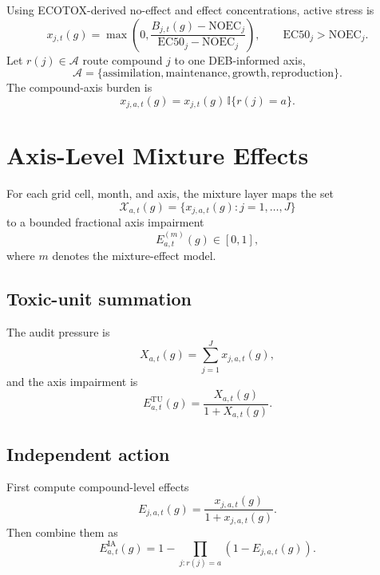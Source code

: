 \documentclass[11pt]{article}
\begin{document}
Using ECOTOX-derived no-effect and effect concentrations, active stress is
\begin{equation}
x_{j,t}(g)
=\max\left(0,\frac{B_{j,t}(g)-\mathrm{NOEC}_j}{\mathrm{EC50}_j-\mathrm{NOEC}_j}\right),
\qquad \mathrm{EC50}_j>\mathrm{NOEC}_j.
\end{equation}
Let $r(j)\in\mathcal{A}$ route compound $j$ to one DEB-informed axis,
\begin{equation}
\mathcal{A}=\{\mathrm{assimilation},\mathrm{maintenance},\mathrm{growth},\mathrm{reproduction}\}.
\end{equation}
The compound-axis burden is
\begin{equation}
x_{j,a,t}(g)=x_{j,t}(g)\,\mathbb{I}\{r(j)=a\}.
\end{equation}

\section{Axis-Level Mixture Effects}
For each grid cell, month, and axis, the mixture layer maps the set
\begin{equation}
\mathcal{X}_{a,t}(g)=\{x_{j,a,t}(g):j=1,\ldots,J\}
\end{equation}
to a bounded fractional axis impairment
\begin{equation}
E_{a,t}^{(m)}(g)\in[0,1],
\end{equation}
where $m$ denotes the mixture-effect model.

\subsection{Toxic-unit summation}
The audit pressure is
\begin{equation}
X_{a,t}(g)=\sum_{j=1}^{J}x_{j,a,t}(g),
\end{equation}
and the axis impairment is
\begin{equation}
E_{a,t}^{\mathrm{TU}}(g)=\frac{X_{a,t}(g)}{1+X_{a,t}(g)}.
\end{equation}

\subsection{Independent action}
First compute compound-level effects
\begin{equation}
E_{j,a,t}(g)=\frac{x_{j,a,t}(g)}{1+x_{j,a,t}(g)}.
\end{equation}
Then combine them as
\begin{equation}
E_{a,t}^{\mathrm{IA}}(g)=1-\prod_{j:r(j)=a}\left(1-E_{j,a,t}(g)\right).
\end{equation}
\end{document}
